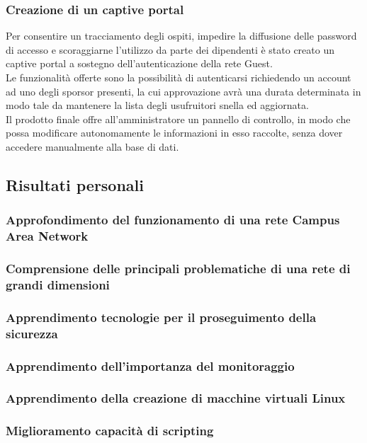 \documentclass[Tesi.tex]{subfiles}
\begin{document}
\subsubsection{Creazione di un captive portal}
Per consentire un tracciamento degli ospiti, impedire la diffusione delle password di accesso e scoraggiarne l'utilizzo da parte dei dipendenti è stato creato un captive portal a sostegno dell'autenticazione della rete Guest. \\
Le funzionalità offerte sono la possibilità di autenticarsi richiedendo un account ad uno degli sporsor presenti, la cui approvazione avrà una durata determinata in modo tale da mantenere la lista degli usufruitori snella ed aggiornata. \\
Il prodotto finale offre all'amministratore un pannello di controllo, in modo che possa modificare autonomamente le informazioni in esso raccolte, senza dover accedere manualmente alla base di dati.

\newpage
\subsection{Risultati personali}
\subsubsection{Approfondimento del funzionamento di una rete Campus Area Network}
\subsubsection{Comprensione delle principali problematiche di una rete di grandi dimensioni}
\subsubsection{Apprendimento tecnologie per il proseguimento della sicurezza}
\subsubsection{Apprendimento dell'importanza del monitoraggio}
\subsubsection{Apprendimento della creazione di macchine virtuali Linux}
\subsubsection{Miglioramento capacità di scripting}
\end{document}
